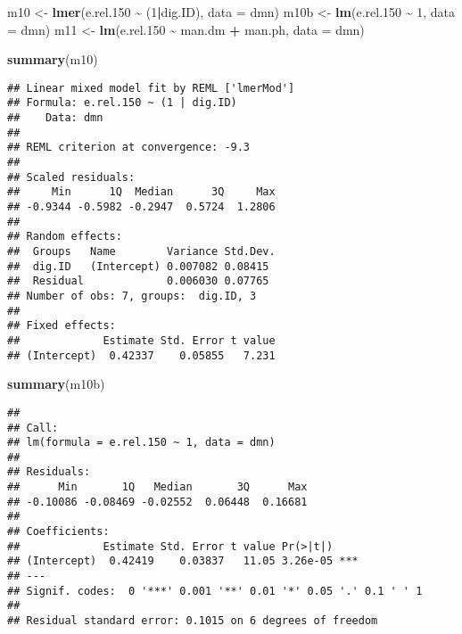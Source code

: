 \documentclass[
]{article}
\newenvironment{Shaded}{\begin{snugshade}}{\end{snugshade}}
\newcommand{\AttributeTok}[1]{\textcolor[rgb]{0.13,0.29,0.53}{#1}}
\newcommand{\DecValTok}[1]{\textcolor[rgb]{0.00,0.00,0.81}{#1}}
\newcommand{\FloatTok}[1]{\textcolor[rgb]{0.00,0.00,0.81}{#1}}
\newcommand{\FunctionTok}[1]{\textcolor[rgb]{0.13,0.29,0.53}{\textbf{#1}}}
\newcommand{\NormalTok}[1]{#1}
\newcommand{\OtherTok}[1]{\textcolor[rgb]{0.56,0.35,0.01}{#1}}
\newcommand{\SpecialCharTok}[1]{\textcolor[rgb]{0.81,0.36,0.00}{\textbf{#1}}}
\begin{document}
\begin{Shaded}
\begin{Highlighting}[]
\NormalTok{m10 }\OtherTok{\textless{}{-}} \FunctionTok{lmer}\NormalTok{(e.rel}\FloatTok{.150} \SpecialCharTok{\textasciitilde{}}\NormalTok{ (}\DecValTok{1}\SpecialCharTok{|}\NormalTok{dig.ID), }\AttributeTok{data =}\NormalTok{ dmn)}
\NormalTok{m10b }\OtherTok{\textless{}{-}} \FunctionTok{lm}\NormalTok{(e.rel}\FloatTok{.150} \SpecialCharTok{\textasciitilde{}} \DecValTok{1}\NormalTok{, }\AttributeTok{data =}\NormalTok{ dmn)}
\NormalTok{m11 }\OtherTok{\textless{}{-}} \FunctionTok{lm}\NormalTok{(e.rel}\FloatTok{.150} \SpecialCharTok{\textasciitilde{}}\NormalTok{ man.dm }\SpecialCharTok{+}\NormalTok{ man.ph, }\AttributeTok{data =}\NormalTok{ dmn)}
\end{Highlighting}
\end{Shaded}

\begin{Shaded}
\begin{Highlighting}[]
\FunctionTok{summary}\NormalTok{(m10)}
\end{Highlighting}
\end{Shaded}

\begin{verbatim}
## Linear mixed model fit by REML ['lmerMod']
## Formula: e.rel.150 ~ (1 | dig.ID)
##    Data: dmn
## 
## REML criterion at convergence: -9.3
## 
## Scaled residuals: 
##     Min      1Q  Median      3Q     Max 
## -0.9344 -0.5982 -0.2947  0.5724  1.2806 
## 
## Random effects:
##  Groups   Name        Variance Std.Dev.
##  dig.ID   (Intercept) 0.007082 0.08415 
##  Residual             0.006030 0.07765 
## Number of obs: 7, groups:  dig.ID, 3
## 
## Fixed effects:
##             Estimate Std. Error t value
## (Intercept)  0.42337    0.05855   7.231
\end{verbatim}

\begin{Shaded}
\begin{Highlighting}[]
\FunctionTok{summary}\NormalTok{(m10b)}
\end{Highlighting}
\end{Shaded}

\begin{verbatim}
## 
## Call:
## lm(formula = e.rel.150 ~ 1, data = dmn)
## 
## Residuals:
##      Min       1Q   Median       3Q      Max 
## -0.10086 -0.08469 -0.02552  0.06448  0.16681 
## 
## Coefficients:
##             Estimate Std. Error t value Pr(>|t|)    
## (Intercept)  0.42419    0.03837   11.05 3.26e-05 ***
## ---
## Signif. codes:  0 '***' 0.001 '**' 0.01 '*' 0.05 '.' 0.1 ' ' 1
## 
## Residual standard error: 0.1015 on 6 degrees of freedom
\end{verbatim}
\end{document}
